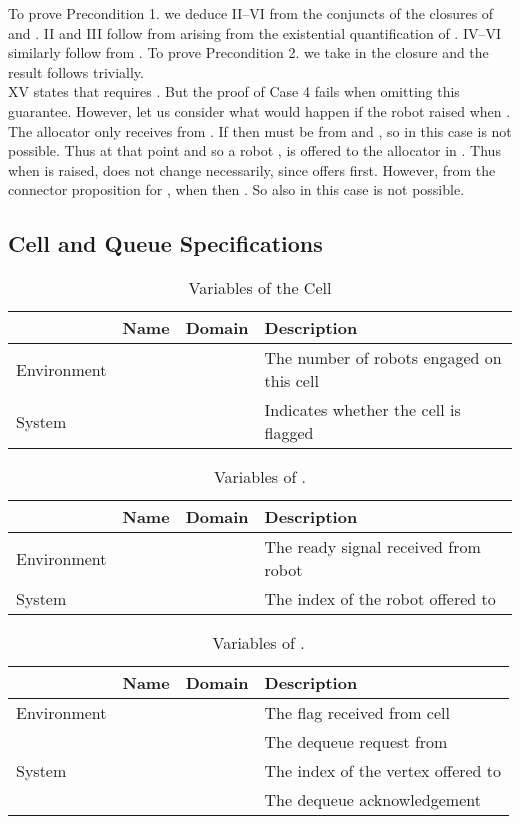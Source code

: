 To prove Precondition 1. we deduce II--VI from the conjuncts of the closures of  and . II and III follow from  arising from the existential quantification of . IV--VI similarly follow from . To prove Precondition 2. we take  in the closure and the result follows trivially.\\

XV states that  requires . But the proof of Case 4 fails when omitting this guarantee. However, let us consider what would happen if the robot raised  when . The allocator only receives  from . If  then  must be  from  and , so in this case  is not possible. Thus at that point  and so a robot ,  is offered to the allocator in . Thus when  is raised,  does not change necessarily, since  offers  first. However, from the connector proposition for , when  then . So also in this case  is not possible.\\


\subsection{Cell and Queue Specifications}

\begin{table}
\centering
\begin{tabular}{l|c|c|l}
\hline
& Name & Domain & Description \\
\hline
Environment &  &  & The number of robots engaged on this cell \\
\hline
System &  &  & Indicates whether the cell is flagged \\
\hline
\end{tabular}
\caption{Variables of the Cell }
\label{tab:cellvars}
\end{table}

\begin{table}
\centering
\begin{tabular}{l|c|c|l}
\hline
& Name & Domain & Description \\
\hline
Environment &  &  & The ready signal received from robot  \\
\hline
System &  &  & The index of the robot offered to \\
\hline
\end{tabular}
\caption{Variables of .}
\label{tab:fiforvars}
\end{table}

\begin{table}
\centering
\begin{tabular}{l|c|c|l}
\hline
& Name & Domain & Description \\
\hline
Environment &  &  & The flag received from cell \\
            &  &  & The dequeue request from \\
\hline
System &  &  & The index of the vertex offered to \\
       &  &  & The dequeue acknowledgement \\
\hline
\end{tabular}
\caption{Variables of .}
\label{tab:fifofvars}
\end{table}

